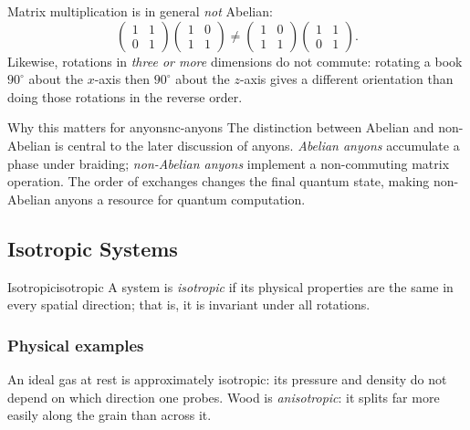 \documentclass[11pt,a4paper]{article}
\begin{document}
Matrix multiplication is in general \emph{not} Abelian:
\[
  \begin{pmatrix}1&1\\0&1\end{pmatrix}
  \begin{pmatrix}1&0\\1&1\end{pmatrix}
  \neq
  \begin{pmatrix}1&0\\1&1\end{pmatrix}
  \begin{pmatrix}1&1\\0&1\end{pmatrix}.
\]
Likewise, rotations in \emph{three or more} dimensions do not commute: rotating
a book $90^\circ$ about the $x$-axis then $90^\circ$ about the $z$-axis gives
a different orientation than doing those rotations in the reverse order.

\begin{rem}{Why this matters for anyons}{nc-anyons}
  The distinction between Abelian and non-Abelian is central to the later
  discussion of anyons.  \emph{Abelian anyons} accumulate a phase under
  braiding; \emph{non-Abelian anyons} implement a non-commuting matrix
  operation.  The order of exchanges changes the final quantum state, making
  non-Abelian anyons a resource for quantum computation.
\end{rem}

\subsection{Isotropic Systems}

\begin{defn}{Isotropic}{isotropic}
  A system is \emph{isotropic} if its physical properties are the same in every
  spatial direction; that is, it is invariant under all rotations.
\end{defn}

\subsubsection{Physical examples}

An ideal gas at rest is approximately isotropic: its pressure and density do
not depend on which direction one probes.  Wood is \emph{anisotropic}: it
splits far more easily along the grain than across it.
\end{document}
